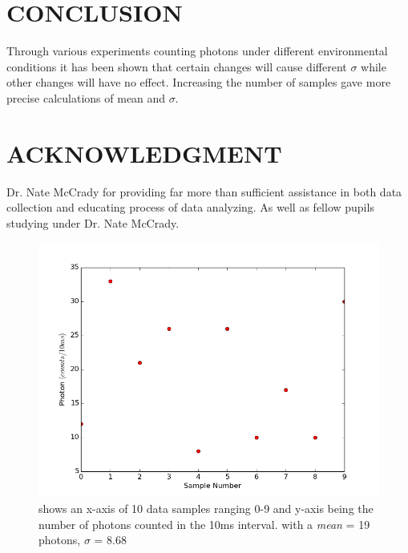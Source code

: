 \documentclass[12 pt,twoside]{article}
\begin{document}
\section{CONCLUSION}

Through various experiments counting photons under different environmental conditions it has been shown that certain changes will cause different $\sigma$ while other changes will have no effect. Increasing the number of samples gave more precise calculations of mean and $\sigma$. 

\section{ACKNOWLEDGMENT}
Dr. Nate McCrady for providing far more than sufficient assistance in both data collection and educating process of data analyzing. As well as fellow pupils studying under Dr. Nate McCrady.

\begin{center}
\begin{figure}[!hb]
\includegraphics[scale=0.7]{figure_1}
\caption{\small{shows an x-axis of 10 data samples ranging 0-9 and y-axis being the number of photons counted in the 10ms interval. with a {\it mean} = 19 photons, $\sigma$ = 8.68 }}
\end{figure}
\end{center}
\end{document}
